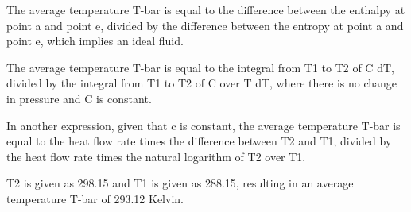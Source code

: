 The average temperature T-bar is equal to the difference between the enthalpy at point a and point e, divided by the difference between the entropy at point a and point e, which implies an ideal fluid.

The average temperature T-bar is equal to the integral from T1 to T2 of C dT, divided by the integral from T1 to T2 of C over T dT, where there is no change in pressure and C is constant.

In another expression, given that c is constant, the average temperature T-bar is equal to the heat flow rate times the difference between T2 and T1, divided by the heat flow rate times the natural logarithm of T2 over T1.

T2 is given as 298.15 and T1 is given as 288.15, resulting in an average temperature T-bar of 293.12 Kelvin.